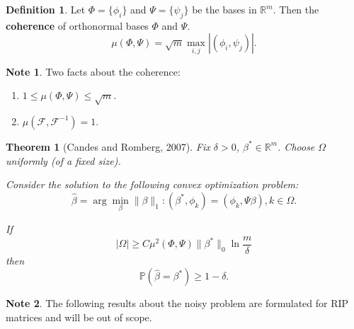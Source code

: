 \documentclass[11pt]{article}
\numberwithin{equation}{section}
\newtheorem{theorem}{Theorem}[section]
\theoremstyle{definition}
\newtheorem{remark}{Note}[section]
\newtheorem{definition}{Definition}[section]
\begin{document}
\begin{definition}
    Let $\Phi = \{\phi_i\}$ and $\Psi = \{\psi_j\}$ be the bases in $\mathbb R^m$.
    Then the \textbf{coherence} of orthonormal bases $\Phi$ and $\Psi$.
    $$ \mu(\Phi, \Psi) = \sqrt{m} \max_{i, j} |(\phi_i, \psi_j)|. $$
\end{definition}

\begin{remark}
    Two facts about the coherence:
    \begin{enumerate}
        \item $ 1 \leq \mu(\Phi, \Psi) \leq \sqrt m $.
        \item $\mu(\mathcal F, \mathcal F^{-1}) = 1$.
    \end{enumerate}
\end{remark}

\begin{theorem}[Candes and Romberg, 2007]
    Fix $\delta > 0$, $\beta^* \in \mathbb R^m$.
    Choose $\Omega$ uniformly (of a fixed size).

    Consider the solution to the following convex optimization problem:
    $$ \hat \beta = \arg \min_\beta \|\beta\|_1: (\beta^*, \phi_k) = (\phi_k, \Psi \beta), k \in \Omega. $$
    
    If
    $$ |\Omega| \ge C \mu^2(\Phi, \Psi) \|\beta^*\|_0 \ln \frac{m}{\delta} $$
    then
    $$ \mathbb P(\hat \beta = \beta^*) \ge 1 - \delta. $$
\end{theorem}

\begin{remark}
    The following results about the noisy problem are formulated for RIP matrices and will be out of scope.
\end{remark}
\end{document}
